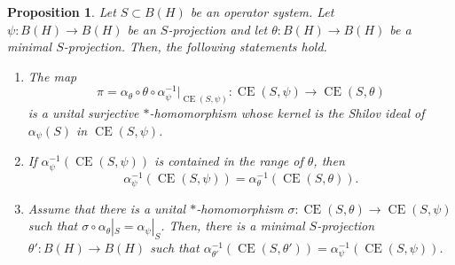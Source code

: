 \documentclass[10pt]{amsart}
\newcommand{\CE}{\operatorname{CE}}
\newtheorem{proposition}[lemma]{Proposition}
\theoremstyle{definition}
\begin{document}
\begin{proposition}\label{P:CEcomp}
Let $S\subset B(H)$ be an operator system.  Let $\psi:B(H)\to B(H)$ be an $S$-projection and let $\theta:B(H)\to B(H)$ be a minimal $S$-projection. Then, the following statements hold.
\begin{enumerate}[{\rm(i)}]
\item The map \[\pi=\alpha_\theta\circ \theta\circ \alpha_\psi^{-1}|_{\CE(S,\psi)}: \CE(S,\psi)\to \CE(S,\theta)\] is a unital surjective $*$-homomorphism whose kernel is the Shilov ideal of $\alpha_\psi(S)$ in $\CE(S,\psi)$.
\item  If $\alpha_\psi^{-1}(\CE(S,\psi))$ is contained in the range of $\theta$, then \[\alpha_\psi^{-1}(\CE(S,\psi))=\alpha_\theta^{-1}( \CE(S,\theta)).\]
\item Assume that there is a unital $*$-homomorphism $\sigma:\CE(S,\theta)\to \CE(S,\psi)$ such that $\sigma\circ\alpha_\theta|_S=\alpha_\psi|_S$. Then, there is a minimal $S$-projection $\theta':B(H)\to B(H)$ such that $\alpha_{\theta'}^{-1}(\CE(S,\theta'))=\alpha_\psi^{-1}(\CE(S,\psi))$. 
\end{enumerate}
\end{proposition}
\end{document}
